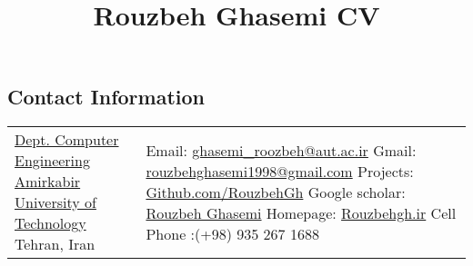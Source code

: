 \documentclass[margin,line,pifont,palatino,courier]{res}
\begin{document}
\title{Rouzbeh Ghasemi CV}
\begin{resume}

\section{\sc Contact Information}
\vspace{.05in}
\begin{tabular}{@{}p{2.5in}p{3in}}
\href{https://ce.aut.ac.ir/index.php?sid=4&slc_lang=en}{Dept. Computer Engineering} \newline 
\href{http://aut.ac.ir/}{Amirkabir University of Technology} \newline   
Tehran, Iran
			& Email: \href{mailto:ghasemi\_roozbeh@aut.ac.ir}{ghasemi\_roozbeh@aut.ac.ir} \newline 
            Gmail: \href{mailto:rouzbehghasemi1998@gmail.com}{rouzbehghasemi1998@gmail.com} \newline
            Projects: \href{https://github.com/RouzbehGh}{Github.com/RouzbehGh}\newline
            Google scholar: \href{https://scholar.google.com/citations?user=edjeFwUAAAAJ&hl=en}{Rouzbeh Ghasemi}\newline
            Homepage: \href{https://rouzbehgh.ir}{Rouzbehgh.ir} \newline
            Cell Phone :(+98) 935 267 1688 \newline

\end{tabular}



%

%

%



\end{resume}
\end{document}
